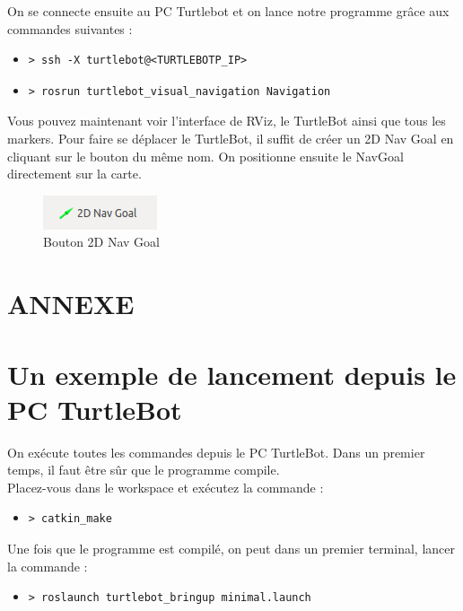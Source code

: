 \documentclass[10pt,a4paper]{article}
\begin{document}
On se connecte ensuite au PC Turtlebot et on lance notre programme grâce aux commandes suivantes :

\begin{itemize}
\item[]  \begin{verbatim}> ssh -X turtlebot@<TURTLEBOTP_IP> \end{verbatim}
\item[]  \begin{verbatim}> rosrun turtlebot_visual_navigation Navigation \end{verbatim}
\end{itemize}

Vous pouvez maintenant voir l'interface de RViz, le TurtleBot ainsi que tous les markers.
Pour faire se déplacer le TurtleBot, il suffit de créer un 2D Nav Goal en cliquant sur le bouton du même nom. On positionne ensuite le NavGoal directement sur la carte.\\
\begin{figure}
 \center
 \includegraphics[scale=0.5]{2DNavGoal.png}
 \caption{Bouton 2D Nav Goal}
\end{figure}


\newpage
\section*{ANNEXE}

\section{Un exemple de lancement depuis le PC TurtleBot}

On exécute toutes les commandes depuis le PC TurtleBot.
Dans un premier temps, il faut être sûr que le programme compile. \\
Placez-vous dans le workspace et exécutez la commande :
\begin{itemize}
\item[] \begin{verbatim}> catkin_make \end{verbatim}
\end{itemize}

Une fois que le programme est compilé, on peut dans un premier terminal, lancer la commande :
\begin{itemize}
\item[] \begin{verbatim}> roslaunch turtlebot_bringup minimal.launch \end{verbatim}
\end{itemize}
\end{document}
